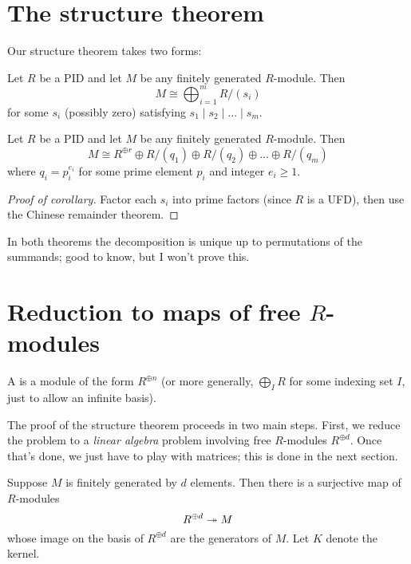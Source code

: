 \section{The structure theorem}
Our structure theorem takes two forms:
\begin{theorem}
	Let $R$ be a PID and let $M$ be any finitely generated $R$-module. Then
	\[ M \cong \bigoplus_{i=1}^m R/(s_i) \]
	for some $s_i$ (possibly zero)
	satisfying $s_1 \mid s_2 \mid \dots \mid s_m$.
\end{theorem}
\begin{corollary}
	Let $R$ be a PID and let $M$ be any finitely generated $R$-module. Then
	\[ M \cong R^{\oplus r}
		\oplus R/(q_1) \oplus R/(q_2) \oplus \dots \oplus R/(q_m) \]
	where $q_i = p_i^{e_i}$ for some prime element $p_i$ and integer $e_i \ge 1$.
\end{corollary}
\begin{proof}
	[Proof of corollary]
	Factor each $s_i$ into prime factors (since $R$ is a UFD),
	then use the Chinese remainder theorem.
\end{proof}
\begin{remark}
	In both theorems the decomposition is unique up to
	permutations of the summands; good to know, but
	I won't prove this.
\end{remark}

\section{Reduction to maps of free $R$-modules}
\begin{definition}
	A  is a module of the form $R^{\oplus n}$
	(or more generally, $\bigoplus_I R$ for some indexing set $I$,
	just to allow an infinite basis).
\end{definition}
The proof of the structure theorem proceeds in two main steps.
First, we reduce the problem to a \emph{linear algebra} problem
involving free $R$-modules $R^{\oplus d}$.
Once that's done, we just have to play with matrices;
this is done in the next section.

Suppose $M$ is finitely generated by $d$ elements.
Then there is a surjective map of $R$-modules
\[ R^{\oplus d} \twoheadrightarrow M \]
whose image on the basis of $R^{\oplus d}$ are the generators of $M$.
Let $K$ denote the kernel.

